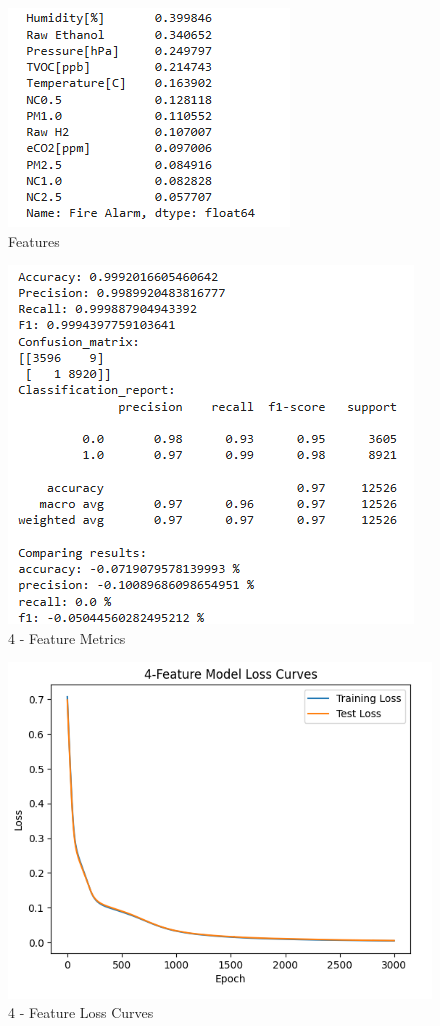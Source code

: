 \documentclass[conference]{IEEEtran}
\begin{document}
\begin{figure}[htbp]
    \centering
    \includegraphics[width=0.7\linewidth]{images/Corr.png}
    \caption{Features}
    \label{fig:corr}
\end{figure}

\begin{figure}[htbp]
    \centering
    \includegraphics[width=0.75\linewidth]{images/4metric.png}
    \caption{4 - Feature Metrics}
    \label{fig:4met}
\end{figure}

\begin{figure}[htbp]
    \centering
    \includegraphics[width=0.75\linewidth]{images/4LC.png}
    \caption{4 - Feature Loss Curves}
    \label{fig:4loss}
\end{figure}
\end{document}
